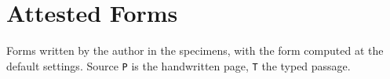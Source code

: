 \chapter{Attested Forms}\label{app:attested}
Forms written by the author in the specimens, with the form computed at the default settings. Source \texttt{P} is the handwritten page, \texttt{T} the typed passage.

{\small}
